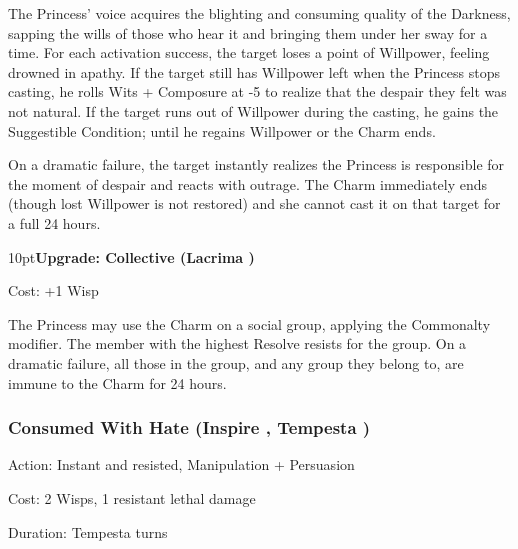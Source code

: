 \noindent The Princess' voice acquires the blighting and consuming quality of the Darkness, sapping the wills of those who hear it and bringing them under her sway for a time. For each activation success, the target loses a point of Willpower, feeling drowned in apathy. If the target still has Willpower left when the Princess stops casting, he rolls Wits + Composure at -5 to realize that the despair they felt was not natural. If the target runs out of Willpower during the casting, he gains the Suggestible Condition; until he regains Willpower or the Charm ends.

On a dramatic failure, the target instantly realizes the Princess is responsible for the moment of despair and reacts with outrage. The Charm immediately ends (though lost Willpower is not restored) and she cannot cast it on that target for a full 24 hours.

\begin{myindentpar}{10pt}\textbf{Upgrade: Collective (Lacrima \textbullet\textbullet\textbullet\textbullet)}

\noindent Cost: +1 Wisp

The Princess may use the Charm on a social group, applying the Commonalty modifier. The member with the highest Resolve resists for the group. On a dramatic failure, all those in the group, and any group they belong to, are immune to the Charm for 24 hours.\end{myindentpar}

\subsubsection*{Consumed With Hate (Inspire \textbullet\textbullet\textbullet\textbullet, Tempesta \textbullet\textbullet\textbullet)}

\noindent Action: Instant and resisted, Manipulation + Persuasion

\noindent Cost: 2 Wisps, 1 resistant lethal damage

\noindent Duration: Tempesta turns \\

